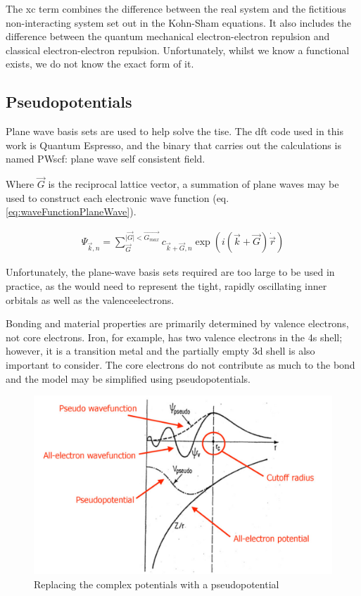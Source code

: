 The \acrshort{xc} term combines the difference between the real system and the fictitious non-interacting system set out in the Kohn-Sham equations.  It also includes the difference between the quantum mechanical electron-electron repulsion and classical electron-electron repulsion.  Unfortunately, whilst we know a functional exists, we do not know the exact form of it\cite{ldaggaperdew}.


 
\subsection{Pseudopotentials}
\label{section:backgroundpseudopotentials}

Plane wave basis sets are used to help solve the \acrshort{tise}.  The \acrshort{dft} code used in this work is Quantum Espresso, and the binary that carries out the calculations is named PWscf: plane wave self consistent field. 

Where $\vec{G}$ is the reciprocal lattice vector, a summation of plane waves may be used to construct each electronic wave function (eq. \ref{eq:waveFunctionPlaneWave})\cite{paynedftreview}.

\begin{equation}
  \begin{split}
  \Psi_{\vec{k}, n} = \sum_{\vec{G}}^{\lvert \vec{G} \rvert < \vec{G_{max}}} c_{\vec{k} + \vec{G}, n} \exp(i(\vec{k} + \vec{G}) \dot \vec{r})
  \end{split}
  \label{eq:waveFunctionPlaneWave}
\end{equation}

Unfortunately, the plane-wave basis sets required are too large to be used in practice, as the would need to represent the tight, rapidly oscillating inner orbitals as well as the \gls{valenceelectron}s.

Bonding and material properties are primarily determined by valence electrons, not core electrons.  Iron, for example, has two valence electrons in the 4s shell; however, it is a transition metal and the partially empty 3d shell is also important to consider.  The core electrons do not contribute as much to the bond and the model may be simplified using pseudopotentials.

\begin{figure}[!htbp]
  \begin{center}
    \includegraphics[width=.4\linewidth]{chapters/interatomic_potential_fitting/images/pp.png}
    \caption{Replacing the complex potentials with a pseudopotential\cite{ppselloni}}
    \label{graph:pseudopotentials}
  \end{center}
\end{figure}

